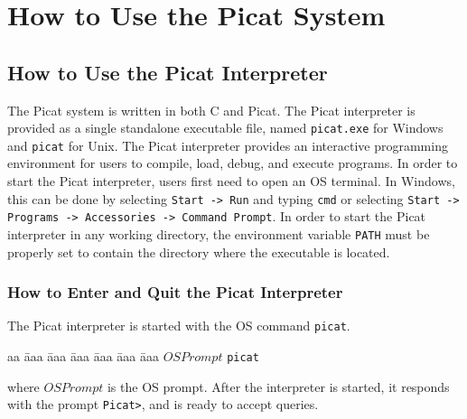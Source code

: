 \chapter{How to Use the Picat System}
\section{How to Use the Picat Interpreter}
The Picat system is written in both C and Picat. The Picat interpreter is provided as a single standalone executable file, named \texttt{picat.exe} for Windows and \texttt{picat} for Unix. The Picat interpreter provides an interactive programming environment for users to compile, load, debug, and execute programs. In order to start the Picat interpreter, users first need to open an OS terminal. In Windows, this can be done by selecting \verb+Start -> Run+ and typing \verb+cmd+ or selecting \verb+Start -> Programs -> Accessories -> Command Prompt+.  In order to start the Picat interpreter in any working directory, the environment variable \texttt{PATH} must be properly set to contain the directory where the executable is located.

\subsection{How to Enter and Quit the Picat Interpreter}
The Picat interpreter is started with the OS command \texttt{picat}. 
\begin{tabbing}
aa \= aaa \= aaa \= aaa \= aaa \= aaa \= aaa \kill
\> \> $OSPrompt$ \texttt{picat}
\end{tabbing}
where $OSPrompt$ is the OS prompt. After the interpreter is started, it responds with the prompt \verb+Picat>+, and is ready to accept queries. 

